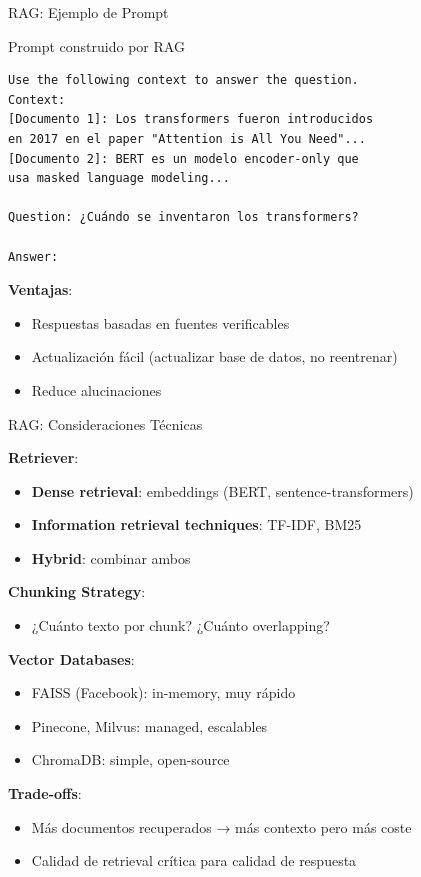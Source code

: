 \begin{frame}[fragile]{RAG: Ejemplo de Prompt}

\begin{block}{Prompt construido por RAG}
\small
\begin{verbatim}
Use the following context to answer the question.
Context:
[Documento 1]: Los transformers fueron introducidos 
en 2017 en el paper "Attention is All You Need"...
[Documento 2]: BERT es un modelo encoder-only que 
usa masked language modeling...

Question: ¿Cuándo se inventaron los transformers?

Answer:
\end{verbatim}
\end{block}

\textbf{Ventajas}:
\begin{itemize}
    \item Respuestas basadas en fuentes verificables
    \item Actualización fácil (actualizar base de datos, no reentrenar)
    \item Reduce alucinaciones
\end{itemize}

\end{frame}

\begin{frame}{RAG: Consideraciones Técnicas}

\textbf{Retriever}:
\begin{itemize}
    \item \textbf{Dense retrieval}: embeddings (BERT, sentence-transformers)
    \item \textbf{Information retrieval techniques}: TF-IDF, BM25
    \item \textbf{Hybrid}: combinar ambos
\end{itemize}

\textbf{Chunking Strategy}:
\begin{itemize}
    \item ¿Cuánto texto por chunk? ¿Cuánto overlapping?
\end{itemize}

\textbf{Vector Databases}:
\begin{itemize}
    \item FAISS (Facebook): in-memory, muy rápido
    \item Pinecone, Milvus: managed, escalables
    \item ChromaDB: simple, open-source
\end{itemize}

\textbf{Trade-offs}:
\begin{itemize}
    \item Más documentos recuperados → más contexto pero más coste
    \item Calidad de retrieval crítica para calidad de respuesta
\end{itemize}

\end{frame}


